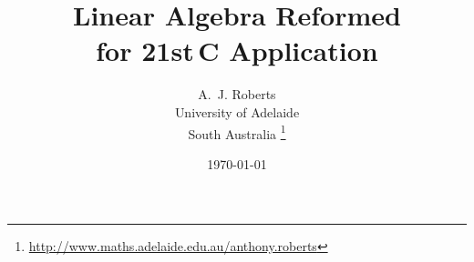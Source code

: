 \documentclass[10pt,a5paper,smallborder]{refrep}
\title{Linear Algebra Reformed
\\for 21st\,C Application}
\author{A.~J. Roberts
\\University of Adelaide
\\South Australia
\thanks{\url{http://www.maths.adelaide.edu.au/anthony.roberts}}}
\date{\today\titlePageInfo}
\begin{document}


\tableofcontents








\makeanswers





\makeanswers








\makeanswers




\makeanswers




\makeanswers




\makeanswers





\makeanswers






\end{document}

